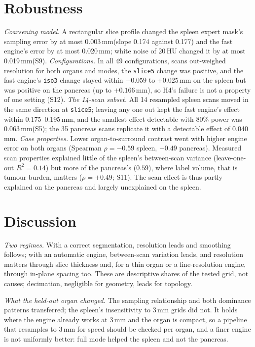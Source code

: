 \documentclass[conference]{IEEEtran}
\newcommand{\lvl}[1]{\texttt{#1}}
\newcommand{\mm}{\,mm\xspace}
\begin{document}
\section{Robustness}
\emph{Coarsening model.} A rectangular slice profile changed the spleen expert mask's sampling error by at most 0.003\mm (slope 0.174 against 0.177) and the fast engine's error by at most 0.020\mm; white noise of 20\,HU changed it by at most 0.019\mm (S9).
\emph{Configurations.} In all 49 configurations, scans out-weighed resolution for both organs and modes, the \lvl{slice5} change was positive, and the fast engine's \lvl{iso3} change stayed within $-0.059$ to $+0.025$\mm on the spleen but was positive on the pancreas (up to $+0.166$\mm), so H4's failure is not a property of one setting (S12).
\emph{The 14-scan subset.} All 14 resampled spleen scans moved in the same direction at \lvl{slice5}; leaving any one out kept the fast engine's effect within 0.175--0.195\mm, and the smallest effect detectable with 80\% power was 0.063\mm (S5); the 35 pancreas scans replicate it with a detectable effect of 0.040\mm.
\emph{Case properties.} Lower organ-to-surround contrast went with higher engine error on both organs (Spearman $\rho=-0.59$ spleen, $-0.49$ pancreas). Measured scan properties explained little of the spleen's between-scan variance (leave-one-out $R^2=0.14$) but more of the pancreas's ($0.59$), where label volume, that is tumour burden, matters ($\rho=+0.49$; S11). The scan effect is thus partly explained on the pancreas and largely unexplained on the spleen.

\section{Discussion}
\emph{Two regimes.} With a correct segmentation, resolution leads and smoothing follows; with an automatic engine, between-scan variation leads, and resolution matters through slice thickness and, for a thin organ or a fine-resolution engine, through in-plane spacing too. These are descriptive shares of the tested grid, not causes; decimation, negligible for geometry, leads for topology.

\emph{What the held-out organ changed.} The sampling relationship and both dominance patterns transferred; the spleen's insensitivity to 3\mm grids did not. It holds where the engine already works at 3\mm and the organ is compact, so a pipeline that resamples to 3\mm for speed should be checked per organ, and a finer engine is not uniformly better: full mode helped the spleen and not the pancreas.
\end{document}
